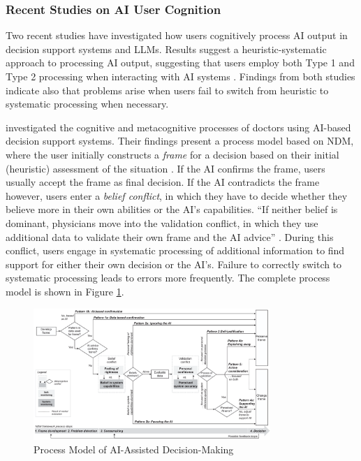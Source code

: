 \subsubsection{Recent Studies on AI User Cognition} \label{sssec:studies_ai_cognition}

Two recent studies have investigated how users cognitively process AI output in decision support systems and \acp{LLM}. Results suggest a heuristic-systematic approach to processing AI output, suggesting that users employ both Type 1 and Type 2 processing when interacting with AI systems \parencite{Jussupow2021,Kazemitabaar2024}. Findings from both studies indicate also that problems arise when users fail to switch from heuristic to systematic processing when necessary.

\textcite{Jussupow2021} investigated the cognitive and metacognitive processes of doctors using \ac{AI}-based decision support systems. Their findings present a process model based on \ac{NDM}, where the user initially constructs a \textit{frame} for a decision based on their initial (heuristic) assessment of the situation \parencite{Klein2008, Klein2015}. If the \ac{AI} confirms the frame, users usually accept the frame as final decision. If the \ac{AI} contradicts the frame however, users enter a \textit{belief conflict}, in which they have to decide whether they believe more in their own abilities or the \ac{AI}'s capabilities. “If neither belief is dominant, physicians move into the validation conflict, in which they use additional data to validate their own frame and the AI advice” \parencite{Jussupow2021}. During this conflict, users engage in systematic processing of additional information to find support for either their own decision or the \ac{AI}'s. Failure to correctly switch to systematic processing leads to errors more frequently. The complete process model is shown in Figure \ref{fig:jussupow_process_model}.

\begin{figure}[ht]
    \centering
    \includegraphics[width=0.8\textwidth]{images/fig_jussupow_model.png}
    \caption[Process Model of AI-Assisted Decision-Making]{Process Model of AI-Assisted Decision-Making \parencite{Jussupow2021}}
    \label{fig:jussupow_process_model}
\end{figure}

